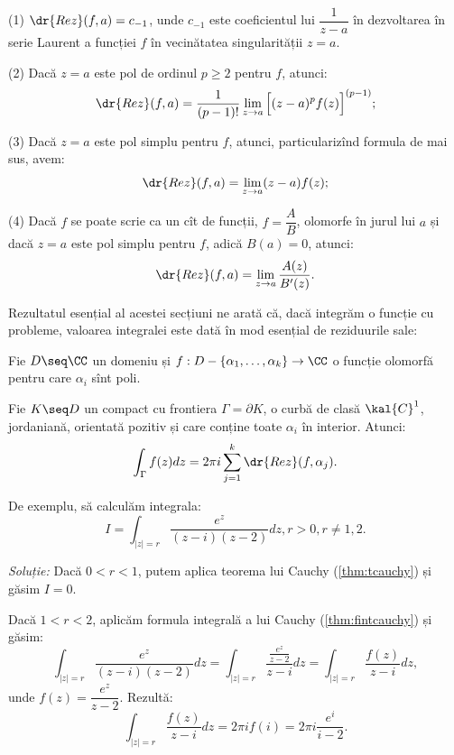 \begin{theorem}\label{thm:calc-rez}
  (1) $ \dr{Rez}(f, a) = c_{-1} $, unde $ c_{-1} $ este coeficientul lui $ \dfrac{1}{z-a} $
  în dezvoltarea în serie Laurent a funcției $ f $ în vecinătatea singularității $ z = a $.

  (2) Dacă $ z = a $ este pol de ordinul $ p \geq 2 $ pentru $ f $, atunci:
  \[
    \dr{Rez}(f, a) = \dfrac{1}{(p-1)!} \lim_{z \to a} \Big[ (z - a)^p f(z) \Big]^{(p-1)};
  \]

  (3) Dacă $ z = a $ este pol simplu pentru $ f $, atunci, particularizînd formula
  de mai sus, avem:
  \[
    \dr{Rez}(f, a) = \lim_{z \to a} (z - a) f(z);
  \]

  (4) Dacă $ f $ se poate scrie ca un cît de funcții, $ f = \dfrac{A}{B} $, olomorfe în
  jurul lui $ a $ și dacă $ z = a $ este pol simplu pentru $ f $, adică $ B(a) = 0 $,
  atunci:
  \[
    \dr{Rez}(f, a) = \lim_{z \to a} \dfrac{A(z)}{B'(z)}.
  \]
\end{theorem}

Rezultatul esențial al acestei secțiuni ne arată că, dacă integrăm o funcție
cu probleme, valoarea integralei este dată în mod esențial de reziduurile sale:

\begin{theorem}\label{thm:t-rez}
  Fie $ D \seq \CC $ un domeniu și $ f : D - \{ \alpha_1, \dots, \alpha_k \} \to \CC $ o funcție
  olomorfă pentru care $ \alpha_i $ sînt poli.

  Fie $ K \seq D $ un compact cu frontiera $ \Gamma = \partial K $, o curbă de clasă
  $ \kal{C}^1 $, jordaniană, orientată pozitiv și care conține toate $ \alpha_i $ în
  interior. Atunci:
  \[
    \int_\Gamma f(z) dz = 2 \pi i \sum_{j = 1}^k \dr{Rez}(f, \alpha_j).
  \]
\end{theorem}

De exemplu, să calculăm integrala:
\[
  I = \int_{|z| = r} \frac{e^z}{(z - i)(z - 2)} dz, r > 0, r \neq 1, 2.
\]

\emph{Soluție:} Dacă $ 0 < r < 1 $, putem aplica teorema lui Cauchy (\ref{thm:tcauchy})
și găsim $ I = 0 $.

Dacă $ 1 < r < 2 $, aplicăm formula integrală a lui Cauchy (\ref{thm:fintcauchy}) și găsim:
\[
  \int_{|z| = r} \frac{e^z}{(z - i)(z - 2)} dz = %
  \int_{|z| = r} \frac{\frac{e^z}{z - 2}}{z - i} dz = %
  \int_{|z| = r} \frac{f(z)}{z - i} dz,
\]
unde $ f(z) = \dfrac{e^z}{z - 2} $. Rezultă:
\[
  \int_{|z| = r} \frac{f(z)}{z - i} dz = 2 \pi i f(i) = 2 \pi i \frac{e^i}{i - 2}.
\]

